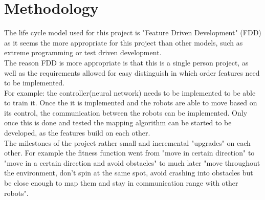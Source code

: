 \section{Methodology}
The life cycle model used for this project is "Feature Driven Development" (FDD) as it seems the more appropriate for this project than other models, such as extreme programming or test driven development. \\
The reason FDD is more appropriate is that this is a single person project, as well as the requirements allowed for easy distinguish in which order features need to be implemented.  \\
For example: the controller(neural network) needs to be implemented to be able to train it. Once the it is implemented and the robots are able to move based on its control, the communication between the robots can be implemented. Only once this is done and tested the mapping algorithm can be started to be developed, as the features build on each other.\\

The milestones of the project rather small and incremental "upgrades" on each other. For example the fitness function went from "move in certain direction" to "move in a certain direction and avoid obstacles" to much later "move throughout the environment, don't spin at the same spot, avoid crashing into obstacles but be close enough to map them and stay in communication range with other robots". \\
 


